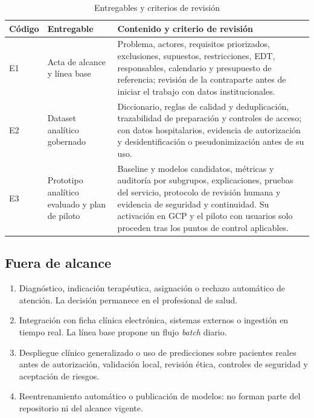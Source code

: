 \documentclass[12pt,a4paper]{article}
\begin{document}
\begin{table}[H]
  \centering
  \caption{Entregables y criterios de revisión}
  \small
  \begin{tabularx}{\textwidth}{@{}p{1.2cm}p{3.5cm}X@{}}
    \toprule
    Código & Entregable & Contenido y criterio de revisión \\
    \midrule
    E1 & Acta de alcance y línea base & Problema, actores, requisitos priorizados, exclusiones, supuestos, restricciones, EDT, responsables, calendario y presupuesto de referencia; revisión de la contraparte antes de iniciar el trabajo con datos institucionales. \\
    E2 & Dataset analítico gobernado & Diccionario, reglas de calidad y deduplicación, trazabilidad de preparación y controles de acceso; con datos hospitalarios, evidencia de autorización y desidentificación o pseudonimización antes de su uso. \\
    E3 & Prototipo analítico evaluado y plan de piloto & Baseline y modelos candidatos, métricas y auditoría por subgrupos, explicaciones, pruebas del servicio, protocolo de revisión humana y evidencia de seguridad y continuidad. Su activación en GCP y el piloto con usuarios solo proceden tras los puntos de control aplicables. \\
    \bottomrule
  \end{tabularx}
\end{table}

\subsection{Fuera de alcance}

\begin{enumerate}[leftmargin=*]
  \item Diagnóstico, indicación terapéutica, asignación o rechazo automático de atención. La decisión permanece en el profesional de salud.
  \item Integración con ficha clínica electrónica, sistemas externos o ingestión en tiempo real. La línea base propone un flujo \emph{batch} diario.
  \item Despliegue clínico generalizado o uso de predicciones sobre pacientes reales antes de autorización, validación local, revisión ética, controles de seguridad y aceptación de riesgos.
  \item Reentrenamiento automático o publicación de modelos: no forman parte del repositorio ni del alcance vigente.
\end{enumerate}
\end{document}
